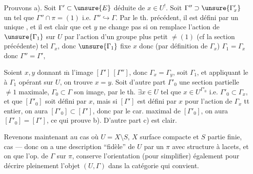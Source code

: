 
Prouvons a). Soit \(\Gamma'\subset \unsure{E}\)
déduite de \(x\in U^!\).
Soit \(\Gamma''\supset\unsure{\Gamma'_x}\) un 
tel que \(\Gamma''\cap\pi=(1)\) i.e. \(\Gamma''\hookrightarrow\Gamma\).
Par le th. précédent, il est défini par un unique
,
et il est clair que cet \(y\) ne change pas si on remplace l'action de
\(\unsure{\Gamma_1}\) sur \(U\) par l'action d'un groupe plus petit
\(\ne(1)\) (cf la section précédente) tel \(\Gamma_x\),
donc \(\unsure{\Gamma_1}\)  fixe \(x\) donc
(par définition de \(\Gamma_x\)) \(\Gamma_1=\Gamma_x\) donc
\(\Gamma''=\Gamma'\), 

Soient \(x,y\) donnant \(\overline{\mathrm m}\) l'image
\([\Gamma']\ [\Gamma'']\), donc \(\Gamma_x=\Gamma_y\), soit \(\Gamma_1\),
et appliquant le  à \(\Gamma_1\) opérant sur \(U\),
on trouve \(x=y\).
Soit d'autre part \(\Gamma'_0\) une section partielle \(\ne1\) maximale,
\(\Gamma_0\subset\Gamma\) son image,
par le th. 
\(\exists x\in U\)  tel que
\(x\in U^{\Gamma'_0}\) i.e. \(\Gamma'_0\subset\Gamma_x\),
et que \([\Gamma'_0]\) soit défini par \(x\),
mais si \([\Gamma']\) est défini par \(x\) pour l'action de
\(\Gamma_x\) tt entier, on aura \([\Gamma'_0]\subset[\Gamma']\),
donc par le car. maximal de \([\Gamma'_0]\), on aura
\([\Gamma'_0]=[\Gamma']\), ce  qui prouve b).
D'autre part c) est clair.



Revenons maintenant au cas où \(U=X\setminus S\), \(X\) surface
 compacte et \(S\) partie
finie, cas  --- donc on a une description
 ``fidèle'' de \(U\) par un \(\pi\) avec
structure à lacets, et on 
que  l'op.  de \(\Gamma\)
sur \(\pi\),  conserve l'orientation (pour simplifier)
également  pour décrire pleinement l'objet
\((U,\Gamma)\) dans la catégorie  qui convient.


